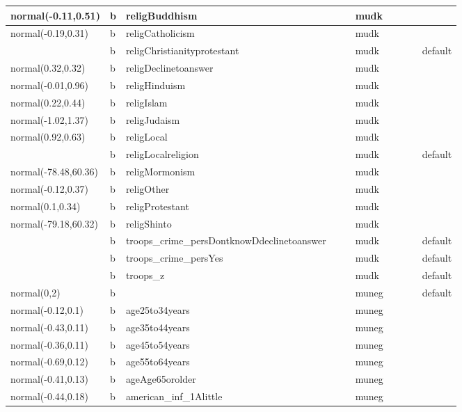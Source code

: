 \documentclass[
]{book}
\theoremstyle{definition}
\theoremstyle{definition}
\theoremstyle{definition}
\theoremstyle{definition}
\theoremstyle{remark}
\begin{document}
\begin{table}
\begin{tabular}[t]{l|l|l|l|l|l|l|l|l|l}
\hline
normal(-0.11,0.51) & b & religBuddhism &  &  & mudk &  &  &  & \\
\hline
normal(-0.19,0.31) & b & religCatholicism &  &  & mudk &  &  &  & \\
\hline
 & b & religChristianityprotestant &  &  & mudk &  &  &  & default\\
\hline
normal(0.32,0.32) & b & religDeclinetoanswer &  &  & mudk &  &  &  & \\
\hline
normal(-0.01,0.96) & b & religHinduism &  &  & mudk &  &  &  & \\
\hline
normal(0.22,0.44) & b & religIslam &  &  & mudk &  &  &  & \\
\hline
normal(-1.02,1.37) & b & religJudaism &  &  & mudk &  &  &  & \\
\hline
normal(0.92,0.63) & b & religLocal &  &  & mudk &  &  &  & \\
\hline
 & b & religLocalreligion &  &  & mudk &  &  &  & default\\
\hline
normal(-78.48,60.36) & b & religMormonism &  &  & mudk &  &  &  & \\
\hline
normal(-0.12,0.37) & b & religOther &  &  & mudk &  &  &  & \\
\hline
normal(0.1,0.34) & b & religProtestant &  &  & mudk &  &  &  & \\
\hline
normal(-79.18,60.32) & b & religShinto &  &  & mudk &  &  &  & \\
\hline
 & b & troops\_crime\_persDontknowDdeclinetoanswer &  &  & mudk &  &  &  & default\\
\hline
 & b & troops\_crime\_persYes &  &  & mudk &  &  &  & default\\
\hline
 & b & troops\_z &  &  & mudk &  &  &  & default\\
\hline
normal(0,2) & b &  &  &  & muneg &  &  &  & default\\
\hline
normal(-0.12,0.1) & b & age25to34years &  &  & muneg &  &  &  & \\
\hline
normal(-0.43,0.11) & b & age35to44years &  &  & muneg &  &  &  & \\
\hline
normal(-0.36,0.11) & b & age45to54years &  &  & muneg &  &  &  & \\
\hline
normal(-0.69,0.12) & b & age55to64years &  &  & muneg &  &  &  & \\
\hline
normal(-0.41,0.13) & b & ageAge65orolder &  &  & muneg &  &  &  & \\
\hline
normal(-0.44,0.18) & b & american\_inf\_1Alittle &  &  & muneg &  &  &  & \\

\end{tabular}
\end{table}
\end{document}
